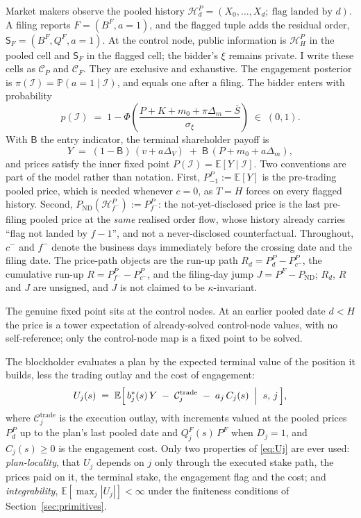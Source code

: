 \documentclass[11pt]{article}
\makeatletter
\newcommand{\compatlabel}[2]{\begingroup\phantomsection\def\@currentlabel{#1}\label{#2}\endgroup}
\newcommand{\Eop}{\mathbb{E}}
\newcommand{\Prb}{\mathbb{P}}
\newcommand{\ND}{\mathrm{ND}}
\newcommand{\Sfl}{\mathsf{S}_F}
\makeatother
\begin{document}
Market makers observe the pooled history
$\mathcal H_d^P=(X_0,\ldots,X_d;\ \text{flag landed by }d)$. A filing reports
$F=(B^F,a=1)$, and the flagged tuple adds the residual order, $\Sfl=(B^F,Q^F,a=1)$. At the control
node, public information is $\mathcal H_H^P$ in the pooled cell and $\Sfl$ in the flagged cell; the
bidder's $\xi$ remains private. I write these cells as $\mathcal C_P$ and $\mathcal C_F$. They are
exclusive and exhaustive. The engagement posterior is $\pi(\mathcal I)=\Prb(a=1\mid\mathcal I)$, and
equals one after a filing. The bidder enters with probability
\begin{equation}
\label{eq:entry}
p(\mathcal I) \;=\; 1 - \Phi\!\left(\frac{P + K + m_0 + \pi\Delta_m - \bar S}{\sigma_\xi}\right)
\;\in\;(0,1).
\end{equation}
With $\mathsf B$ the entry indicator, the terminal shareholder payoff is
\begin{equation}
\label{eq:Y}
Y \;=\; (1-\mathsf B)\,(v + a\Delta_V) \;+\; \mathsf B\,(P + m_0 + a\Delta_m),
\end{equation}
and prices satisfy the inner fixed point $P(\mathcal I) = \Eop[Y\mid\mathcal I]$. Two conventions are
part of the model rather than notation. First, $P_{-1}^P := \Eop[Y]$ is the pre-trading pooled
price, which is needed whenever $c = 0$, as $T = H$ forces on every flagged history. Second,
$P_{\ND}(\mathcal H_{f^-}^P) := P_{f^-}^P$: the not-yet-disclosed price is the last pre-filing pooled
price at the \emph{same} realised order flow, whose history already carries ``flag not landed by
$f-1$'', and not a never-disclosed counterfactual. Throughout, $c^-$ and $f^-$ denote the business days
immediately before the crossing date and the filing date. The price-path objects are the run-up path
$R_d = P_d^P - P_{c^-}^P$, the cumulative run-up $R = P_{f^-}^P - P_{c^-}^P$, and the filing-day
jump $J = P^F - P_{\ND}$; $R_d$, $R$ and $J$ are unsigned, and $J$ is not claimed to be
$\kappa$-invariant.\compatlabel{3}{def:prices}

The genuine fixed point sits at the control nodes. At an earlier pooled date $d < H$ the price is a
tower expectation of already-solved control-node values, with no self-reference; only the
control-node map is a fixed point to be solved.

The blockholder evaluates a plan by the expected terminal value of the position it builds, less the
trading outlay and the cost of engagement:
\begin{equation}
\label{eq:Uj}
U_j(s) \;=\; \Eop\Bigl[\, b_j^*(s)\,Y \;-\; \mathcal C_j^{\mathrm{trade}} \;-\; a_j\,C_j(s)
\;\Bigm\vert\; s,\, j \,\Bigr],
\end{equation}
where $\mathcal C_j^{\mathrm{trade}}$ is the execution outlay, with increments valued at the pooled
prices $P_d^P$ up to the plan's last pooled date and $Q_j^F(s)\,P^F$ when $D_j = 1$, and
$C_j(s) \ge 0$ is the engagement cost. Only two properties of \eqref{eq:Uj} are ever used:
\emph{plan-locality}, that $U_j$ depends on $j$ only through the executed stake path, the prices paid
on it, the terminal stake, the engagement flag and the cost; and \emph{integrability},
$\Eop[\max_{j}|U_j|] < \infty$ under the finiteness conditions of Section~\ref{sec:primitives}.
\compatlabel{4}{def:U}
\end{document}
